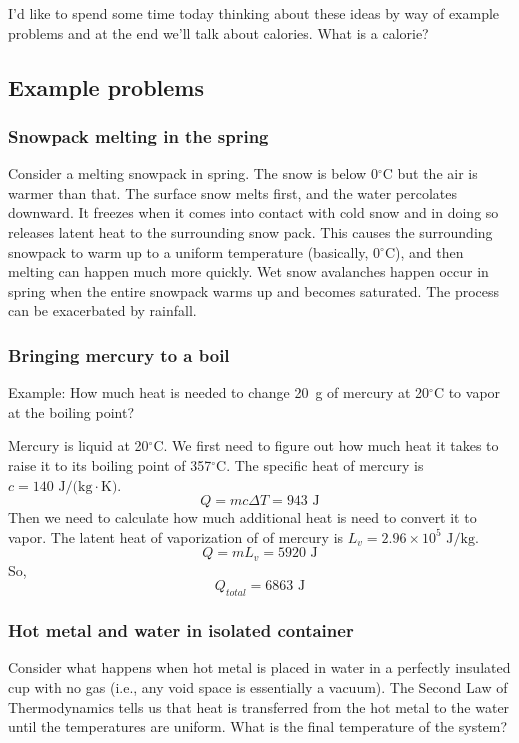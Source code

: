 I'd like to spend some time today thinking about these ideas by way of example problems and at the end we'll talk about calories. What is a calorie?

\subsection{Example problems}
\subsubsection{Snowpack melting in the spring}

Consider a melting snowpack in spring. The snow is below 0$^\circ$C but the air is warmer than that. The surface snow melts first, and the water percolates downward. It freezes when it comes into contact with cold snow and in doing so releases latent heat to the surrounding snow pack. This causes the surrounding snowpack to warm up to a uniform temperature (basically, 0$^\circ$C), and then melting can happen much more quickly. Wet snow avalanches happen occur in spring when the entire snowpack warms up and becomes saturated. The process can be exacerbated by rainfall.

\vspace{5cm}


\subsubsection{Bringing mercury to a boil}
Example: How much heat is needed to change 20~g of mercury at 20$^\circ$C to vapor at the boiling point?

Mercury is liquid at 20$^\circ$C. We first need to figure out how much heat it takes to raise it to its boiling point of 357$^\circ$C. The specific heat of mercury is $c=140\mbox{ J}/\mbox{(kg}\cdot\mbox{K)}$.
$$Q=mc\Delta{T}=943\mbox{ J}$$
Then we need to calculate how much additional heat is need to convert it to vapor. The latent heat of vaporization of of mercury is $L_v=2.96\times 10^5\mbox{ J/kg}$.
$$Q=mL_v=5920\mbox{ J}$$
So, 
$$\boxed{Q_{total}=6863\mbox{ J}}$$



\subsubsection{Hot metal and water in isolated container}
Consider what happens when hot metal is placed in water in a perfectly insulated cup with no gas (i.e., any void space is essentially a vacuum). The Second Law of Thermodynamics tells us that heat is transferred from the hot metal to the water until the temperatures are uniform. What is the final temperature of the system?

